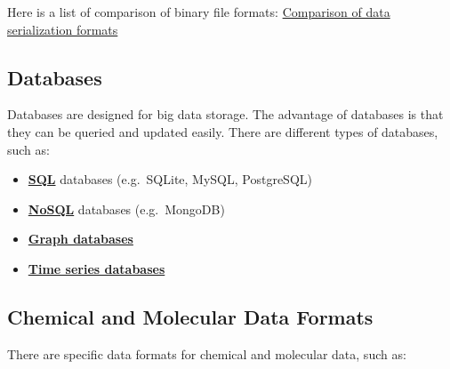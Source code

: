 \documentclass[
  letterpaper,
  DIV=11,
  numbers=noendperiod]{scrreprt}
\providecommand{\tightlist}{%
  \setlength{\itemsep}{0pt}\setlength{\parskip}{0pt}}\usepackage{longtable,booktabs,array}
\begin{document}
Here is a list of comparison of binary file formats:
\href{https://en.wikipedia.org/wiki/Comparison_of_data-serialization_formats}{Comparison
of data serialization formats}

\subsection*{Databases}\label{databases}

Databases are designed for big data storage. The advantage of databases
is that they can be queried and updated easily. There are different
types of databases, such as:

\begin{itemize}
\tightlist
\item
  \textbf{\href{https://en.wikipedia.org/wiki/SQL}{SQL}} databases
  (e.g.~SQLite, MySQL, PostgreSQL)
\item
  \textbf{\href{https://en.wikipedia.org/wiki/NoSQL}{NoSQL}} databases
  (e.g.~MongoDB)
\item
  \textbf{\href{https://en.wikipedia.org/wiki/Graph_database\#List_of_graph_databases}{Graph
  databases}}
\item
  \textbf{\href{https://en.wikipedia.org/wiki/Time_series_database}{Time
  series databases}}
\end{itemize}

\subsection*{Chemical and Molecular Data
Formats}\label{chemical-and-molecular-data-formats}

There are specific data formats for chemical and molecular data, such
as:
\end{document}
